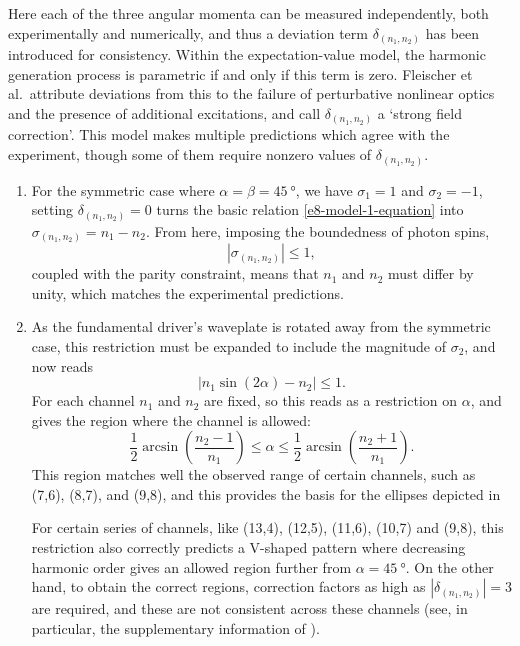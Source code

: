 Here each of the three angular momenta can be measured independently, both experimentally and numerically, and thus a deviation term $\delta_{(n_1,n_2)}$ has been introduced for consistency. Within the expectation-value model, the harmonic generation process is parametric if and only if this term is zero. Fleischer et al.\ attribute deviations from this to the failure of perturbative nonlinear optics and the presence of additional excitations, and call $\delta_{(n_1,n_2)}$ a `strong field correction'. This model makes multiple predictions which agree with the experiment, though some of them require nonzero values of $\delta_{(n_1,n_2)}$.

\begin{enumerate}[label=(\roman*)]

 \item
 For the symmetric case where $\alpha=\beta=\SI{45}{\degree}$, we have $\sigma_1=1$ and $\sigma_2=-1$, setting \mbox{$\delta_{(n_1,n_2)}=0$} turns the basic relation \eqref{e8-model-1-equation} into $\sigma_{(n_1,n_2)}=n_1-n_2$. From here, imposing the boundedness of photon spins, 
 \begin{equation}
 |\sigma_{(n_1,n_2)}|\leq 1,
 \label{e8-photon-spin-boundedness}
 \end{equation} coupled with the parity constraint, means that $n_1$ and $n_2$ must differ by unity, which matches the experimental predictions.
 
 \item
 As the fundamental driver's waveplate is rotated away from the symmetric case, this restriction must be expanded to include the magnitude of $\sigma_2$, and now reads
 \begin{equation}
 |n_1\sin(2\alpha) - n_2| \leq 1.
 \label{e8-channel-existence-region}
 \end{equation}
 For each channel $n_1$ and $n_2$ are fixed, so this reads as a restriction on $\alpha$, and gives the region where the channel is allowed:
 \begin{equation}
 \frac12\arcsin\left(\frac{n_2-1}{n_1}\right)\leq\alpha\leq\frac12\arcsin\left(\frac{n_2+1}{n_1}\right).
 \label{e8-channel-existence-region-unbundled}
 \end{equation}
 This region matches well the observed range of certain channels, such as (7,6), (8,7), and (9,8), and this provides the basis for the ellipses depicted in 
 
 For certain series of channels, like (13,4), (12,5), (11,6), (10,7) and (9,8), this restriction also correctly predicts a V-shaped pattern where decreasing harmonic order gives an allowed region further from $\alpha=\SI{45}{\degree}$. On the other hand, to obtain the correct regions, correction factors as high as $|\delta_{(n_1,n_2)}|=3$ are required, and these are not consistent across these channels (see, in particular, the supplementary information of ).
 

\end{enumerate}
